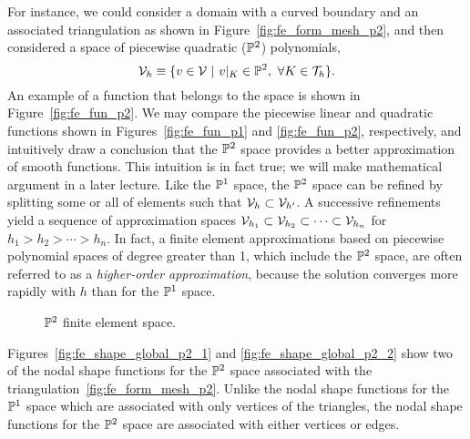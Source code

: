 For instance, we could consider a domain with a curved boundary and an associated triangulation as shown in Figure~\ref{fig:fe_form_mesh_p2}, and then considered a space of piecewise quadratic ($\mathbb{P}^2$) polynomials,
\begin{equation}
  \mathcal{V}_h \equiv \{ v \in \mathcal{V} \ | \ v|_K \in \mathbb{P}^2, \ \forall K \in \mathcal{T}_h \}.
  \label{eq:fe_form_Vh_p2}
\end{equation}
An example of a function that belongs to the space is shown in Figure~\ref{fig:fe_fun_p2}.  We may compare the piecewise linear and quadratic functions shown in Figures~\ref{fig:fe_fun_p1} and \ref{fig:fe_fun_p2}, respectively, and intuitively draw a conclusion that the $\mathbb{P}^2$ space provides a better approximation of smooth functions.  This intuition is in fact true; we will make mathematical argument in a later lecture. Like the $\mathbb{P}^1$ space, the $\mathbb{P}^2$ space can be refined by splitting some or all of elements such that $\mathcal{V}_h \subset \mathcal{V}_{h'}$. A successive refinements yield a sequence of approximation spaces $\mathcal{V}_{h_1} \subset \mathcal{V}_{h_2} \subset \dots \subset \mathcal{V}_{h_n}$ for $h_1 > h_2 > \cdots > h_n$. In fact, a finite element approximations based on piecewise polynomial spaces of degree greater than 1, which include the $\mathbb{P}^2$ space, are often referred to as a \emph{higher-order approximation}, because the solution converges more rapidly with $h$ than for the $\mathbb{P}^1$ space. 

\begin{figure}
  \centering
  \caption{$\mathbb{P}^2$ finite element space.}
\end{figure}

Figures~\ref{fig:fe_shape_global_p2_1} and \ref{fig:fe_shape_global_p2_2} show two of the nodal shape functions for the $\mathbb{P}^2$ space associated with the triangulation~\ref{fig:fe_form_mesh_p2}.  Unlike the nodal shape functions for the $\mathbb{P}^1$ space which are associated with only vertices of the triangles, the nodal shape functions for the $\mathbb{P}^2$ space are associated with either vertices or edges.  

